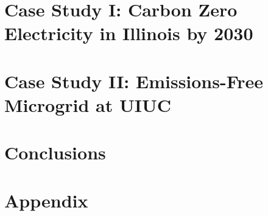 \documentclass[edeposit,fullpage,11pt]{uiucthesis2018}
\begin{document}
\chapter{Case Study I: Carbon Zero Electricity in Illinois by 2030}
\label{chapter:illinois}


 \chapter{Case Study II: Emissions-Free Microgrid at UIUC}
\label{chapter:uiuc}
 

\chapter{Conclusions}


%
\appendix
{}
\chapter*{Appendix}

%
\backmatter



\end{document}
